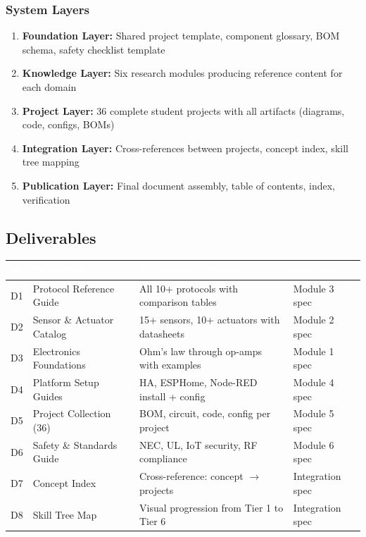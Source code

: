 \documentclass[11pt,letterpaper]{article}
\newcommand{\tableheader}[1]{\textbf{\sffamily\textcolor{white}{#1}}}
\begin{document}
\subsubsection{System Layers}

\begin{enumerate}
  \item \textbf{Foundation Layer:} Shared project template, component glossary, BOM schema, safety checklist template
  \item \textbf{Knowledge Layer:} Six research modules producing reference content for each domain
  \item \textbf{Project Layer:} 36 complete student projects with all artifacts (diagrams, code, configs, BOMs)
  \item \textbf{Integration Layer:} Cross-references between projects, concept index, skill tree mapping
  \item \textbf{Publication Layer:} Final document assembly, table of contents, index, verification
\end{enumerate}

\subsection{Deliverables}

\begin{center}
\begin{tabularx}{\textwidth}{C{0.5cm}L{3.5cm}XL{3cm}}
\toprule
{}
\tableheader{\#} & \tableheader{Deliverable} & \tableheader{Acceptance Criteria} & \tableheader{Spec Source} \\
\midrule
D1 & Protocol Reference Guide & All 10+ protocols with comparison tables & Module 3 spec \\
D2 & Sensor \& Actuator Catalog & 15+ sensors, 10+ actuators with datasheets & Module 2 spec \\
D3 & Electronics Foundations & Ohm's law through op-amps with examples & Module 1 spec \\
D4 & Platform Setup Guides & HA, ESPHome, Node-RED install + config & Module 4 spec \\
D5 & Project Collection (36) & BOM, circuit, code, config per project & Module 5 spec \\
D6 & Safety \& Standards Guide & NEC, UL, IoT security, RF compliance & Module 6 spec \\
D7 & Concept Index & Cross-reference: concept $\rightarrow$ projects & Integration spec \\
D8 & Skill Tree Map & Visual progression from Tier 1 to Tier 6 & Integration spec \\
\bottomrule
\end{tabularx}
\end{center}
\end{document}
